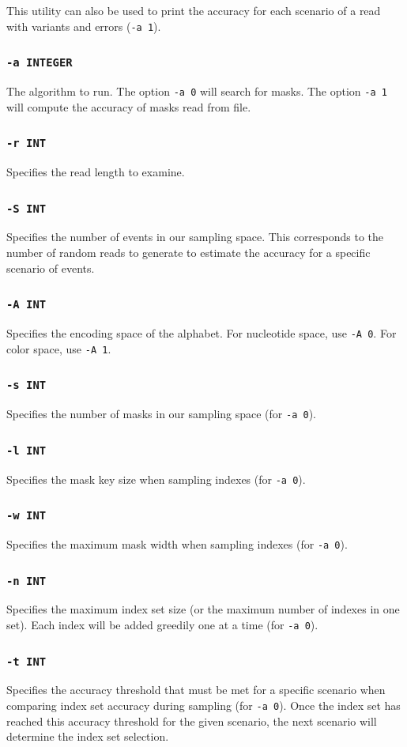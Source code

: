 \documentclass[a4paper,12pt]{book}
\newcommand{\TT}[1]{{\tt #1}} %
\begin{document}
This utility can also be used to print the accuracy for each scenario of a read with variants and errors (\TT{-a 1}). 

\subsubsection{\TT{-a INTEGER}}
The algorithm to run.
The option \TT{-a 0} will search for masks.
The option \TT{-a 1} will compute the accuracy of masks read from file.
\subsubsection{\TT{-r INT}}
Specifies the read length to examine.
\subsubsection{\TT{-S INT}}
Specifies the number of events in our sampling space.
This corresponds to the number of random reads to generate to estimate the accuracy for a specific scenario of events.
\subsubsection{\TT{-A INT}}
Specifies the encoding space of the alphabet.
For nucleotide space, use \TT{-A 0}.
For color space, use \TT{-A 1}.
\subsubsection{\TT{-s INT}}
Specifies the number of masks in our sampling space (for \TT{-a 0}).
\subsubsection{\TT{-l INT}}
Specifies the mask key size when sampling indexes (for \TT{-a 0}).
\subsubsection{\TT{-w INT}}
Specifies the maximum mask width when sampling indexes (for \TT{-a 0}).
\subsubsection{\TT{-n INT}}
Specifies the maximum index set size (or the maximum number of indexes in one set).
Each index will be added greedily one at a time (for \TT{-a 0}).
\subsubsection{\TT{-t INT}}
Specifies the accuracy threshold that must be met for a specific scenario when comparing index set accuracy during sampling (for \TT{-a 0}).
Once the index set has reached this accuracy threshold for the given scenario, the next scenario will determine the index set selection.
\end{document}
